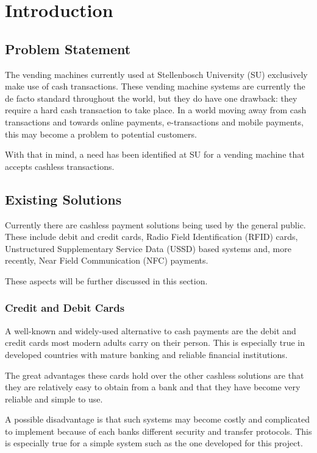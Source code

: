\chapter{Introduction}
\label{chap:1}

\section{Problem Statement}

The vending machines currently used at Stellenbosch University (SU) exclusively
make use of cash transactions. These vending machine systems are currently the
de facto standard throughout the world, but they do have one drawback:
they require a hard cash transaction to take place. In a world moving away from
cash transactions and towards online payments, e-transactions and mobile
payments, this may become a problem to potential customers.

With that in mind, a need has been identified at SU for a vending machine that accepts
cashless transactions.

\section{Existing Solutions}

Currently there are cashless payment solutions being used by the general public.
These include debit and credit cards, Radio Field Identification (RFID) cards,
Unstructured Supplementary Service Data (USSD) based systems and, more recently, Near
Field Communication (NFC) payments.

These aspects will be further discussed in this section.

\subsection{Credit and Debit Cards}

A well-known and widely-used alternative to cash payments are the debit and
credit cards most modern adults carry on their person. This is especially
true in developed countries with mature banking and reliable financial
institutions.

The great advantages these cards hold over the other cashless solutions are
that they are relatively easy to obtain from a bank and that they have become very
reliable and simple to use.

A possible disadvantage is that such systems may become costly and complicated to implement
because of each banks different security and transfer protocols. This is especially true
for a simple system such as the one developed for this project.

